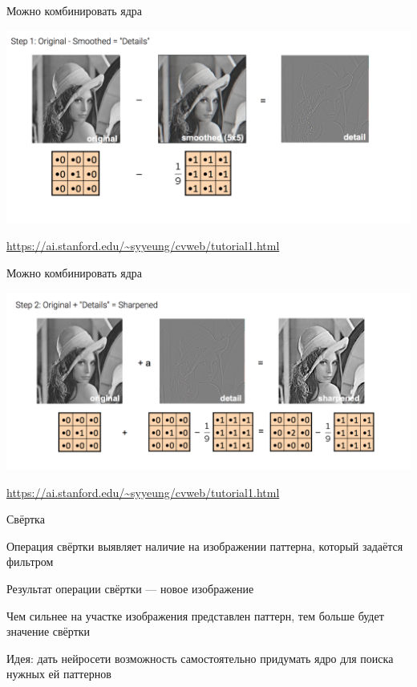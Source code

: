 \documentclass[notes,12pt, aspectratio=169]{beamer}
\newenvironment{wideitemize}{\itemize\addtolength{\itemsep}{10pt}}{\enditemize}
\begin{document}
\begin{frame}{Можно комбинировать ядра} 
\begin{center}
	\includegraphics[width=.9\linewidth]{lena_lena_1.png}
\end{center}

\vfill %
\footnotesize
{\color{blue} \url{https://ai.stanford.edu/~syyeung/cvweb/tutorial1.html}}
\end{frame}


\begin{frame}{Можно комбинировать ядра} 
\begin{center}
	\includegraphics[width=.9\linewidth]{lena_lena_2.png}
\end{center}

\vfill %
\footnotesize
{\color{blue} \url{https://ai.stanford.edu/~syyeung/cvweb/tutorial1.html}}
\end{frame}




\begin{frame}{Свёртка}
\begin{wideitemize}
	\item  Операция свёртки выявляет наличие на изображении паттерна, который задаётся фильтром
	\item Результат операции свёртки — новое изображение
	\item Чем сильнее на участке изображения представлен паттерн, тем больше будет значение свёртки
	\item \alert{Идея:} дать нейросети возможность самостоятельно придумать ядро для поиска нужных ей паттернов
\end{wideitemize}
\end{frame}
\end{document}
